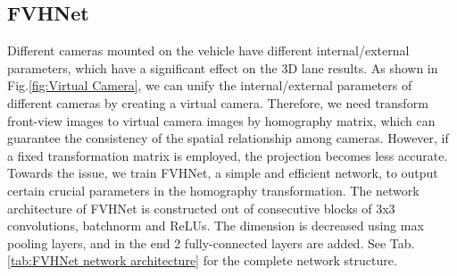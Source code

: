 \subsection{FVHNet}
\label{subsec:FVHNet}
Different cameras mounted on the vehicle have different internal/external parameters,
which have a significant effect on the 3D lane results.
As shown in Fig.\ref{fig:Virtual Camera},
we can unify the internal/external parameters of different cameras by creating a virtual camera.
Therefore, we need transform front-view images to virtual camera images by homography matrix,
which can guarantee the consistency of the spatial relationship among cameras.
However, if a fixed transformation matrix is employed, the projection becomes less accurate.
Towards the issue, we train FVHNet, a simple and efficient network, to output certain crucial parameters in the homography transformation.
The network architecture of FVHNet is constructed out of consecutive blocks of 3x3 convolutions, batchnorm and ReLUs.
The dimension is decreased using max pooling layers, and in the end 2 fully-connected layers are added.
See Tab.\ref{tab:FVHNet network architecture} for the complete network structure.

